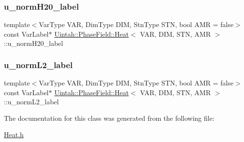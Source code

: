 \mbox{\label{classUintah_1_1PhaseField_1_1Heat_a47032b7137df200ce4990faf6f65188d}} 
\subsubsection{\texorpdfstring{u\+\_\+norm\+H20\+\_\+label}{u\_normH20\_label}}
{\footnotesize\ttfamily template$<$Var\+Type V\+AR, Dim\+Type D\+IM, Stn\+Type S\+TN, bool A\+MR = false$>$ \\
const Var\+Label$\ast$ \hyperlink{classUintah_1_1PhaseField_1_1Heat}{Uintah\+::\+Phase\+Field\+::\+Heat}$<$ V\+AR, D\+IM, S\+TN, A\+MR $>$\+::u\+\_\+norm\+H20\+\_\+label\hspace{0.3cm}{\ttfamily [protected]}}

\mbox{\label{classUintah_1_1PhaseField_1_1Heat_a03406a63938c13923f72306097a3aef2}} 
\subsubsection{\texorpdfstring{u\+\_\+norm\+L2\+\_\+label}{u\_normL2\_label}}
{\footnotesize\ttfamily template$<$Var\+Type V\+AR, Dim\+Type D\+IM, Stn\+Type S\+TN, bool A\+MR = false$>$ \\
const Var\+Label$\ast$ \hyperlink{classUintah_1_1PhaseField_1_1Heat}{Uintah\+::\+Phase\+Field\+::\+Heat}$<$ V\+AR, D\+IM, S\+TN, A\+MR $>$\+::u\+\_\+norm\+L2\+\_\+label\hspace{0.3cm}{\ttfamily [protected]}}



The documentation for this class was generated from the following file\+:\begin{DoxyCompactItemize}
\item 
\hyperlink{Heat_8h}{Heat.\+h}\end{DoxyCompactItemize}
